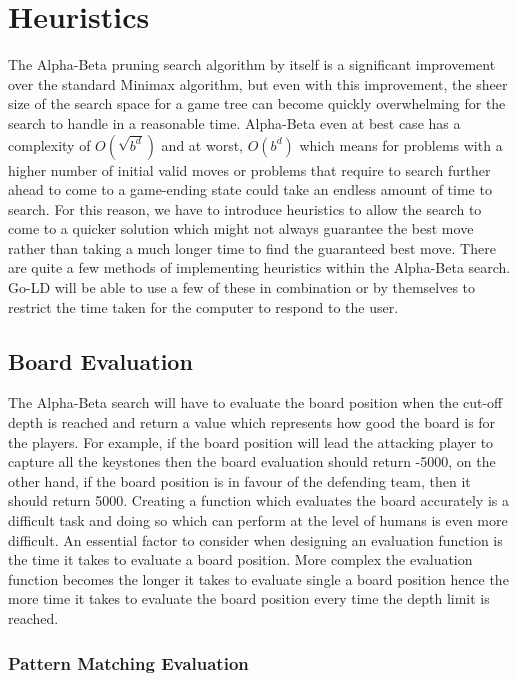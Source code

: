 \documentclass{l4proj}
\begin{document}
\section{Heuristics}

The Alpha-Beta pruning search algorithm by itself is a significant improvement over the standard Minimax algorithm, but even with this improvement, the sheer size of the search space for a game tree can become quickly overwhelming for the search to handle in a reasonable time. Alpha-Beta even at best case has a complexity of $O(\sqrt{b^d})$ and at worst, $O(b^d)$  which means for problems with a higher number of initial valid moves or problems that require to search further ahead to come to a game-ending state could take an endless amount of time to search. For this reason, we have to introduce heuristics to allow the search to come to a quicker solution which might not always guarantee the best move rather than taking a much longer time to find the guaranteed best move. There are quite a few methods of implementing heuristics within the Alpha-Beta search. Go-LD will be able to use a few of these in combination or by themselves to restrict the time taken for the computer to respond to the user.

\subsection{Board Evaluation}
The Alpha-Beta search will have to evaluate the board position when the cut-off depth is reached and return a value which represents how good the board is for the players. For example, if the board position will lead the attacking player to capture all the keystones then the board evaluation should return -5000,   on the other hand, if the board position is in favour of the defending team, then it should return 5000. Creating a function which evaluates the board accurately is a difficult task and doing so which can perform at the level of humans is even more difficult. An essential factor to consider when designing an evaluation function is the time it takes to evaluate a board position. More complex the evaluation function becomes the longer it takes to evaluate single a board position hence the more time it takes to evaluate the board position every time the depth limit is reached.

\subsubsection{Pattern Matching Evaluation}
\end{document}
